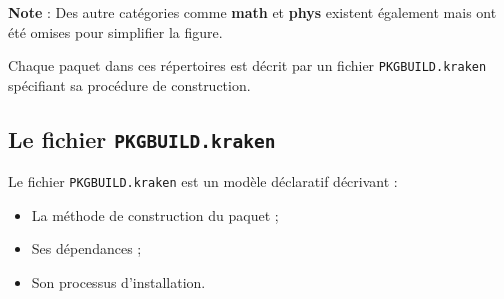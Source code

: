 \textbf{Note} : Des autre catégories comme  \textbf{math} et \textbf{phys} existent également mais ont été omises pour simplifier la figure.

Chaque paquet dans ces répertoires est décrit par un fichier \texttt{PKGBUILD.kraken} spécifiant sa procédure de construction.

\subsection{Le fichier \texttt{PKGBUILD.kraken}}
\label{subsubsec:pkgbuild-file}

Le fichier \texttt{PKGBUILD.kraken} est un modèle déclaratif décrivant :
\begin{itemize}
    \item La méthode de construction du paquet ;
    \item Ses dépendances ;
    \item Son processus d'installation.
\end{itemize}

